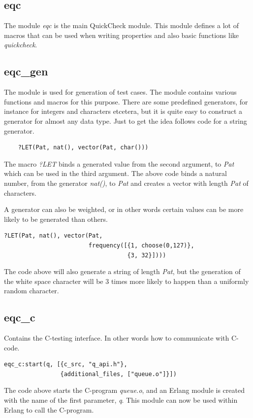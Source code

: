 \subsection{eqc}
The module \emph{eqc} is the main QuickCheck module. This module defines a lot
of macros that can be used when writing properties and also basic functions
like \emph{quickcheck}.

\subsection{eqc\_gen} The module is used for generation of test cases. The module
contains various functions and macros for this purpose. There are some
predefined generators, for instance for integers and characters etcetera, but it
is quite easy to construct a generator for almost any data type. Just to get the
idea follows code for a string generator.
\begin{lstlisting}
    ?LET(Pat, nat(), vector(Pat, char()))
\end{lstlisting}
The macro \emph{?LET} binds a generated value from the second argument, to \emph{Pat} which can be
used in the third argument. The above code binds a natural number, from the
generator \emph{nat()}, to \emph{Pat} and creates a vector with length
\emph{Pat} of characters.

A generator can also be weighted, or in other words certain values can be more
likely to be generated than others.

\begin{lstlisting}
?LET(Pat, nat(), vector(Pat,
                        frequency([{1, choose(0,127)},
                                   {3, 32}])))
\end{lstlisting}
The code above will also generate a string of length \emph{Pat}, but the
generation of the white space character will be 3 times more likely to happen
than a uniformly random character.

\subsection{eqc\_c} Contains the C-testing interface. In other words how to
communicate with C-code.

\begin{lstlisting}
eqc_c:start(q, [{c_src, "q_api.h"},
                {additional_files, ["queue.o"]}])
\end{lstlisting}
The code above starts the C-program \emph{queue.o}, and an Erlang module is
created with the name of the first parameter, \emph{q}. This module can now
be used within Erlang to call the C-program.

